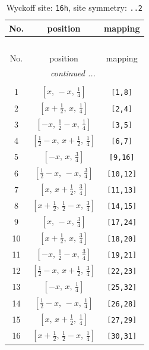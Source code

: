 \documentclass[fleqn,8pt]{jsarticle}
\begin{document}
\renewcommand{\arraystretch}{1.2}
\begin{longtable}{ccc}
\caption{Wyckoff site: {\tt 16h}, site symmetry: {\tt ..2}}
 \\
 \hline \hline
No. & position & mapping \\ \hline \endfirsthead

\multicolumn{2}{l}{\tablename\ \thetable{}} \\
 \hline \hline
No. & position & mapping \\ \hline \endhead

 \hline \hline
\multicolumn{2}{r}{\footnotesize\it continued ...} \\ \endfoot

 \hline \hline
\multicolumn{2}{r}{} \\ \endlastfoot

1 & $\left[ x,\, - x,\, \frac{1}{4} \right]$ & {\tt [1,8]} \\ \hline
2 & $\left[ x + \frac{1}{2},\, x,\, \frac{1}{4} \right]$ & {\tt [2,4]} \\ \hline
3 & $\left[ - x,\, \frac{1}{2} - x,\, \frac{1}{4} \right]$ & {\tt [3,5]} \\ \hline
4 & $\left[ \frac{1}{2} - x,\, x + \frac{1}{2},\, \frac{1}{4} \right]$ & {\tt [6,7]} \\ \hline
5 & $\left[ - x,\, x,\, \frac{3}{4} \right]$ & {\tt [9,16]} \\ \hline
6 & $\left[ \frac{1}{2} - x,\, - x,\, \frac{3}{4} \right]$ & {\tt [10,12]} \\ \hline
7 & $\left[ x,\, x + \frac{1}{2},\, \frac{3}{4} \right]$ & {\tt [11,13]} \\ \hline
8 & $\left[ x + \frac{1}{2},\, \frac{1}{2} - x,\, \frac{3}{4} \right]$ & {\tt [14,15]} \\ \hline
9 & $\left[ x,\, - x,\, \frac{3}{4} \right]$ & {\tt [17,24]} \\ \hline
10 & $\left[ x + \frac{1}{2},\, x,\, \frac{3}{4} \right]$ & {\tt [18,20]} \\ \hline
11 & $\left[ - x,\, \frac{1}{2} - x,\, \frac{3}{4} \right]$ & {\tt [19,21]} \\ \hline
12 & $\left[ \frac{1}{2} - x,\, x + \frac{1}{2},\, \frac{3}{4} \right]$ & {\tt [22,23]} \\ \hline
13 & $\left[ - x,\, x,\, \frac{1}{4} \right]$ & {\tt [25,32]} \\ \hline
14 & $\left[ \frac{1}{2} - x,\, - x,\, \frac{1}{4} \right]$ & {\tt [26,28]} \\ \hline
15 & $\left[ x,\, x + \frac{1}{2},\, \frac{1}{4} \right]$ & {\tt [27,29]} \\ \hline
16 & $\left[ x + \frac{1}{2},\, \frac{1}{2} - x,\, \frac{1}{4} \right]$ & {\tt [30,31]} \\
\end{longtable}
\end{document}
